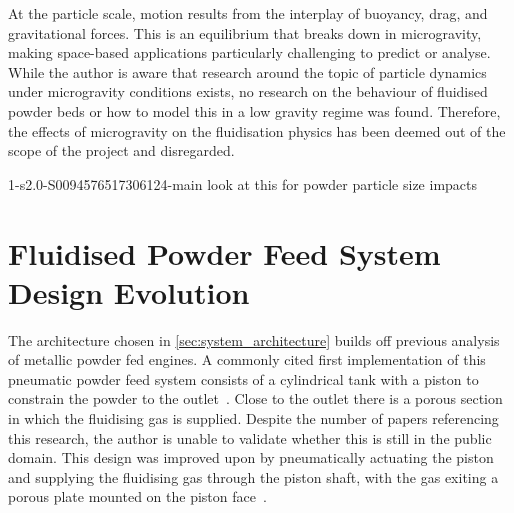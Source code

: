 At the particle scale, motion results from the interplay of buoyancy, drag, and gravitational forces. This is an equilibrium that breaks down in microgravity, making space-based applications particularly challenging to predict or analyse. While the author is aware that research around the topic of particle dynamics under microgravity conditions exists, no research on the behaviour of fluidised powder beds or how to model this in a low gravity regime was found. Therefore, the effects of microgravity on the fluidisation physics has been deemed out of the scope of the project and disregarded.




1-s2.0-S0094576517306124-main look at this for powder particle size impacts
\newpage
\section{Fluidised Powder Feed System Design Evolution}\label{sec:fluidised-powder-feed-systems}
The architecture chosen in \autoref{sec:system_architecture} builds off previous analysis of metallic powder fed engines. A commonly cited first implementation of this pneumatic powder feed system consists of a cylindrical tank with a piston to constrain the powder to the outlet~\cite{LI2021712}. Close to the outlet there is a porous section in which the fluidising gas is supplied. Despite the number of papers referencing this research, the author is unable to validate whether this is still in the public domain. This design was improved upon by pneumatically actuating the piston and supplying the fluidising gas through the piston shaft, with the gas exiting a porous plate mounted on the piston face~\cite{Loftus1972}. 

